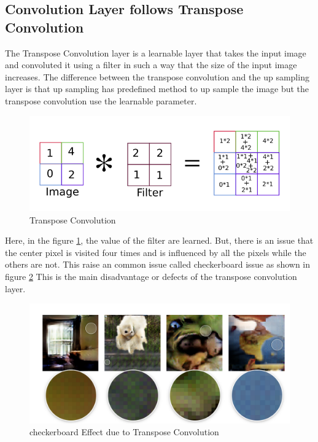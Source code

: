             \subsection{Convolution Layer follows Transpose Convolution}
                The Transpose Convolution layer is a learnable layer that takes the input image and convoluted it using a filter in such a way that the size of the input image increases. The difference between the transpose convolution and the up sampling layer is that up sampling has predefined method to up sample the image but the transpose convolution use the learnable parameter. 
                \begin{figure}[h]                 
                    \centering                 
                    \includegraphics[width=.9\textwidth]{img/experiment/transConv2d.png}                 
                    \caption{Transpose Convolution}                 
                    \label{fig:Transpose Convolution}         
                \end{figure}
                Here, in the figure \ref{fig:Transpose Convolution}, the value of the filter are learned. But, there is an issue that the center pixel is visited four times and is influenced by all the pixels while the others are not. This raise an common issue called checkerboard issue as shown in figure \ref{fig:checkerboard Effect due to Transpose Convolution} This is the main disadvantage or defects of the transpose convolution layer.
                \begin{figure}[h]                 
                    \centering                 
                    \includegraphics[width=.9\textwidth]{img/experiment/checkerboardeffect.png}                 
                    \caption{checkerboard Effect due to Transpose Convolution}                 
                    \label{fig:checkerboard Effect due to Transpose Convolution}         
                \end{figure}
